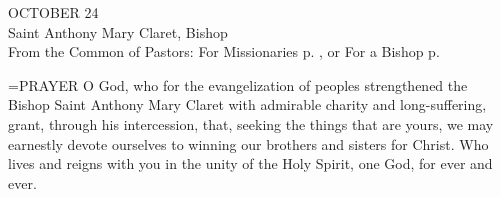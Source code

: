 \begin{center}\normalsize OCTOBER 24\\
\footnotesize Saint Anthony Mary Claret, Bishop\\
\footnotesize From the Common of Pastors: For Missionaries p.   , or For a Bishop p.\\
\end{center}

\hangindent=\parindent \small{PRAYER 
O God, who for the evangelization of peoples
strengthened the Bishop Saint Anthony Mary Claret
with admirable charity and long-suffering,
grant, through his intercession,
that, seeking the things that are yours,
we may earnestly devote ourselves
to winning our brothers and sisters for Christ.
Who lives and reigns with you in the unity of the Holy Spirit,
one God, for ever and ever.\\}
 
